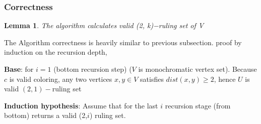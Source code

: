 \documentclass[11pt]{article}
\newtheorem{lemma}[theorem]{Lemma}
\begin{document}
\subsubsection*{Correctness}

\begin{lemma}
\label{U_RULING_SET_correctness}
The algorithm calculates valid (2, k)−ruling set of V
\end{lemma}
The Algorithm correctness is heavily similar to previous subsection. proof by induction on the recursion depth, 

\textbf{Base}: for $i = 1$ (bottom recursion step) ($V$ is monochromatic vertex set). Because $c$ is valid coloring, any two vertices $x,y \in V$ satisfies $dist(x,y) \ge 2$, hence $U$ is valid $(2,1)-$ruling set

\textbf{Induction hypothesis}: Assume that for the last $i$ recursion stage (from bottom) returns a valid (2,$i$) ruling set.
\end{document}
